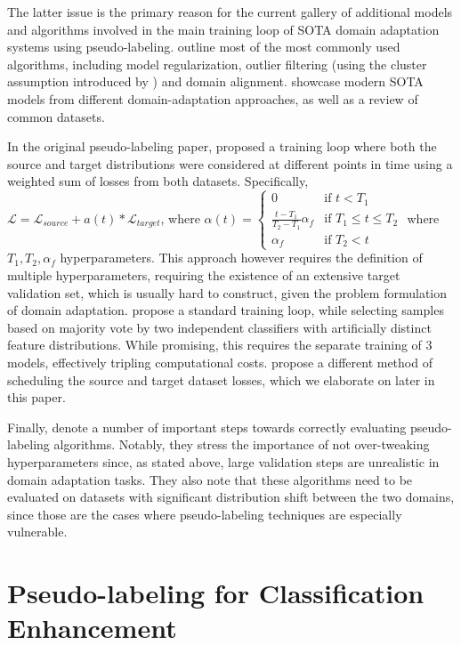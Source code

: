 \documentclass[12pt, a4paper]{article}
\newcommand{\loss}{\mathcal{L}}
\begin{document}
	The latter issue is the primary reason for the current gallery of additional models and algorithms involved in the main training loop of SOTA domain adaptation systems using pseudo-labeling. \cite{good-practices} outline most of the most commonly used algorithms, including model regularization, outlier filtering (using the cluster assumption introduced by \cite{pseudo-label-original}) and domain alignment. \cite{model-survey} showcase modern SOTA models from different domain-adaptation approaches, as well as a review of common datasets.
	
	In the original pseudo-labeling paper, \cite{pseudo-label-original} proposed a training loop where both the source and target distributions were considered at different points in time using a weighted sum of losses from both datasets. Specifically, $\loss = \loss_{source} + a(t) * \loss_{target}$, where $\alpha(t) = 
	\begin{cases} 0 & \text{if } t < T_1 \\
		\frac{t-T_1}{T_2-T_1}\alpha_f & \text{if } T_1 \leq t \leq T_2 \\
		\alpha_f & \text{if } T_2 < t
	\end{cases}$
	where $T_1, T_2, \alpha_f$ hyperparameters. This approach however requires the definition of multiple hyperparameters, requiring the existence of an extensive target validation set, which is usually hard to construct, given the problem formulation of domain adaptation. \cite{three-models} propose a standard    training loop, while selecting samples based on majority vote by two independent classifiers with artificially distinct feature distributions. While promising, this requires the separate training of 3 models, effectively tripling computational costs. \cite{ican} propose a different method of scheduling the source and target dataset losses, which we elaborate on later in this paper.
	
	Finally, \cite{pseudo-label-evaluation} denote a number of important steps towards correctly evaluating pseudo-labeling algorithms. Notably, they stress the importance of not over-tweaking hyperparameters since, as stated above, large validation steps are unrealistic in domain adaptation tasks. They also note that these algorithms need to be evaluated on datasets with significant distribution shift between the two domains, since those are the cases where pseudo-labeling techniques are especially vulnerable.
	
	
	\section{Pseudo-labeling for Classification Enhancement}
	
\end{document}
